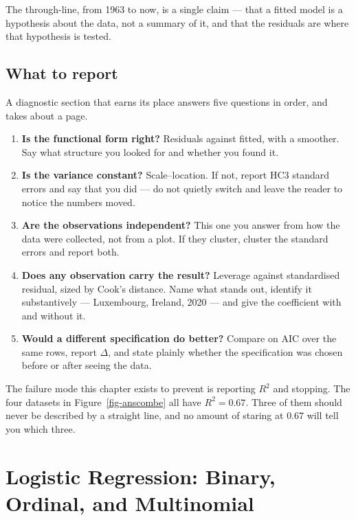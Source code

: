 \documentclass[
  letterpaper,
  10pt,
  twoside,
  openright,
  numbers=noenddot,
  chapterprefix=true]{scrbook}
\providecommand{\tightlist}{%
  \setlength{\itemsep}{0pt}\setlength{\parskip}{0pt}}
\begin{document}
\begin{qmiblit}
The through-line, from 1963 to now, is a single claim --- that a fitted
model is a hypothesis about the data, not a summary of it, and that the
residuals are where that hypothesis is tested.

\end{qmiblit}

\section{What to report}\label{what-to-report-1}

A diagnostic section that earns its place answers five questions in
order, and takes about a page.

\begin{enumerate}
\def\labelenumi{\arabic{enumi}.}
\tightlist
\item
  \textbf{Is the functional form right?} Residuals against fitted, with
  a smoother. Say what structure you looked for and whether you found
  it.
\item
  \textbf{Is the variance constant?} Scale--location. If not, report HC3
  standard errors and say that you did --- do not quietly switch and
  leave the reader to notice the numbers moved.
\item
  \textbf{Are the observations independent?} This one you answer from
  how the data were collected, not from a plot. If they cluster, cluster
  the standard errors and report both.
\item
  \textbf{Does any observation carry the result?} Leverage against
  standardised residual, sized by Cook's distance. Name what stands out,
  identify it substantively --- Luxembourg, Ireland, 2020 --- and give
  the coefficient with and without it.
\item
  \textbf{Would a different specification do better?} Compare on AIC
  over the same rows, report \(\Delta\), and state plainly whether the
  specification was chosen before or after seeing the data.
\end{enumerate}

The failure mode this chapter exists to prevent is reporting \(R^2\) and
stopping. The four datasets in Figure~\ref{fig-anscombe} all have
\(R^2 = 0.67\). Three of them should never be described by a straight
line, and no amount of staring at \(0.67\) will tell you which three.


\chapter{Logistic Regression: Binary, Ordinal, and
Multinomial}\label{logistic-regression-binary-ordinal-and-multinomial}
\end{document}
